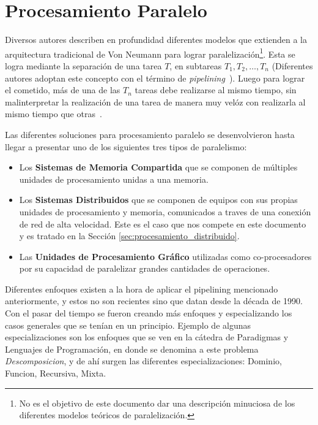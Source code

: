 \section{Procesamiento Paralelo}
\label{sec:procesamiento_paralelo}

Diversos autores\cite{moldovan93, trobec2018} describen en profundidad diferentes modelos que
extienden a la arquitectura tradicional de Von Neumann para lograr
paralelización\footnote{No es el objetivo de este documento dar una descripción minuciosa de los
diferentes modelos teóricos de paralelización.}. Esta se logra mediante la separación de una tarea $T$, en subtareas
$T_{1}, T_{2}, \ldots , T_{n}$ (Diferentes autores adoptan este concepto con el
término de \textit{\gls{pipelining}}~\cite{hyde98, trobec2018}). Luego para lograr el cometido, 
más de una de las $T_{n}$ tareas debe realizarse al mismo tiempo, sin malinterpretar la
realización de una tarea de manera muy velóz con realizarla al mismo tiempo que
otras~\cite{hyde98}.

Las diferentes soluciones para procesamiento paralelo se desenvolvieron hasta
llegar a presentar uno de los siguientes tres tipos de
paralelismo\cite{trobec2018}:

\begin{itemize}
\item Los {\bf Sistemas de Memoria Compartida} que se componen de múltiples unidades de procesamiento
unidas a una memoria.
\item Los {\bf Sistemas Distribuidos} que se componen de equipos con sus propias unidades de procesamiento
y memoria, comunicados a traves de una conexión de red de alta velocidad. Este
es el caso que nos compete en este documento y es tratado en la Sección
\ref{sec:procesamiento_distribuido}.
\item Las {\bf Unidades de Procesamiento Gráfico} utilizadas como co-procesadores por su
capacidad de paralelizar grandes cantidades de operaciones.
\end{itemize}

Diferentes enfoques existen a la hora de aplicar el \gls{pipelining} mencionado
anteriormente, y estos no son recientes sino que datan desde la década de 1990.
Con el pasar del tiempo se fueron creando más enfoques y especializando los
casos generales que se tenían en un principio. Ejemplo de algunas
especializaciones son los enfoques que se ven en la cátedra de Paradigmas y Lenguajes 
de Programación\cite{pylp1}, en donde se denomina a este problema
\textit{Descomposicion}, y de ahí surgen las diferentes especializaciones:
Dominio, Funcion, Recursiva, Mixta.

